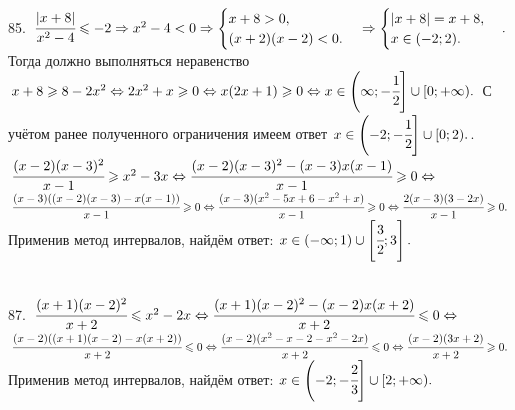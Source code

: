 \documentclass[12pt]{article}
\begin{document}
85. $\cfrac{|x+8|}{x^2-4}\leqslant-2\Rightarrow x^2-4<0\Rightarrow \begin{cases}x+8>0,\\ (x+2)(x-2)<0.\end{cases} \Rightarrow\begin{cases}|x+8|=x+8,\\ x\in (-2;2).\end{cases}.$ Тогда должно выполняться неравенство $x+8\geqslant 8-2x^2 \Leftrightarrow 2x^2+x \geqslant 0 \Leftrightarrow
x(2x+1)\geqslant 0 \Leftrightarrow x\in\left(\-\infty;-\cfrac{1}{2}\right]\cup[0;+\infty).$ С учётом ранее полученного ограничения имеем ответ $x\in \left(-2;-\cfrac{1}{2}\right]\cup[0;2).$\newpage{}. $\cfrac{(x-2)(x-3)^2}{x-1}\geqslant x^2-3x\Leftrightarrow \cfrac{(x-2)(x-3)^2-(x-3)x(x-1)}{x-1}\geqslant0\Leftrightarrow$\\
$\cfrac{(x-3)((x-2)(x-3)-x(x-1))}{x-1}\geqslant0\Leftrightarrow\cfrac{(x-3)(x^2-5x+6-x^2+x)}{x-1}\geqslant0
\Leftrightarrow \cfrac{2(x-3)(3-2x)}{x-1}\geqslant0.$ Применив метод интервалов, найдём ответ: $x\in(-\infty;1)\cup\left[\cfrac{3}{2};3\right].$
\begin{figure}[ht!]
\end{figure}\\
87. $\cfrac{(x+1)(x-2)^2}{x+2}\leqslant x^2-2x\Leftrightarrow \cfrac{(x+1)(x-2)^2-(x-2)x(x+2)}{x+2}\leqslant0\Leftrightarrow$\\
$\cfrac{(x-2)((x+1)(x-2)-x(x+2))}{x+2}\leqslant0\Leftrightarrow\cfrac{(x-2)(x^2-x-2-x^2-2x)}{x+2}\leqslant0
\Leftrightarrow \cfrac{(x-2)(3x+2)}{x+2}\geqslant0.$ Применив метод интервалов, найдём ответ: $x\in\left(-2;-\cfrac{2}{3}\right]\cup[2;+\infty).$
\begin{figure}[ht!]
\end{figure}\\
\end{document}
